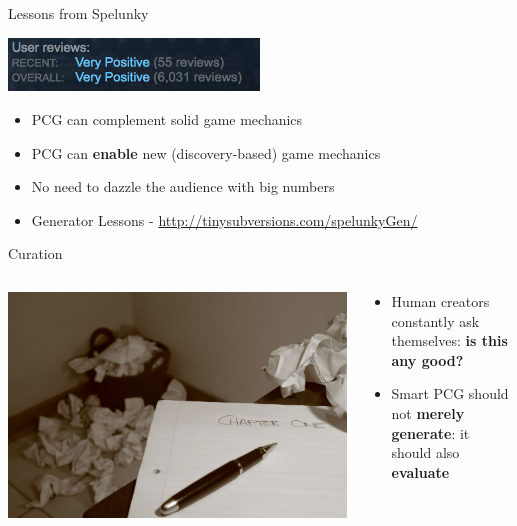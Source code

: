 \begin{frame}{Lessons from Spelunky}
	\begin{center}
		\pause\includegraphics[width=0.5\textwidth]{spelunky_steamreviews}
	\end{center}
	\begin{itemize}
		\pause\item PCG can complement solid game mechanics
		\pause\item PCG can \textbf{enable} new (discovery-based) game mechanics
		\pause\item No need to dazzle the audience with big numbers
		\pause\item Generator Lessons - \url{http://tinysubversions.com/spelunkyGen/}
	\end{itemize}	
\end{frame}


\begin{frame}{Curation}
	\begin{columns}
		\begin{column}{0.4\textwidth}
			\pause\includegraphics[width=\textwidth]{curation}
		\end{column}
		\begin{column}{0.55\textwidth}
			\begin{itemize}
				\pause\item Human creators constantly ask themselves: \textbf{is this any good?}
				\pause\item Smart PCG should not \textbf{merely generate}: it should also
					\textbf{evaluate}
			\end{itemize}
		\end{column}
	\end{columns}
\end{frame}

